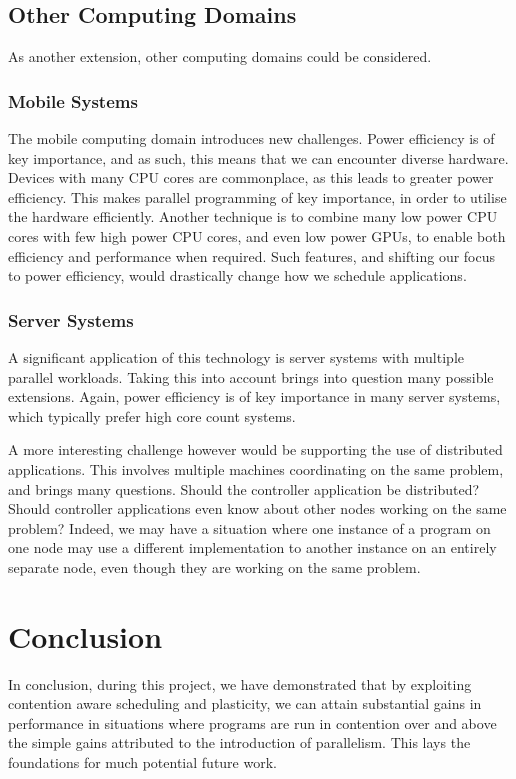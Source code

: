 \subsection{Other Computing Domains}
\label{section:conclusion_and_future_work:other_computing_domains}

As another extension, other computing domains could be considered.

\subsubsection{Mobile Systems}
\label{section:conclusion_and_future_work:mobile_systems}

The mobile computing domain introduces new challenges. Power efficiency is of key importance, and as such, this means that we can encounter diverse hardware. Devices with many CPU cores are commonplace, as this leads to greater power efficiency. This makes parallel programming of key importance, in order to utilise the hardware efficiently. Another technique is to combine many low power CPU cores with few high power CPU cores, and even low power GPUs, to enable both efficiency and performance when required. Such features, and shifting our focus to power efficiency, would drastically change how we schedule applications.



\subsubsection{Server Systems}
\label{section:conclusion_and_future_work:server_systems}

A significant application of this technology is server systems with multiple parallel workloads. Taking this into account brings into question many possible extensions. Again, power efficiency is of key importance in many server systems, which typically prefer high core count systems. 

A more interesting challenge however would be supporting the use of distributed applications. This involves multiple machines coordinating on the same problem, and brings many questions. Should the controller application be distributed? Should controller applications even know about other nodes working on the same problem? Indeed, we may have a situation where one instance of a program on one node may use a different implementation to another instance on an entirely separate node, even though they are working on the same problem.



\section{Conclusion}

In conclusion, during this project, we have demonstrated that by exploiting contention aware scheduling and plasticity, we can attain substantial gains in performance in situations where programs are run in contention over and above the simple gains attributed to the introduction of parallelism. This lays the foundations for much potential future work.